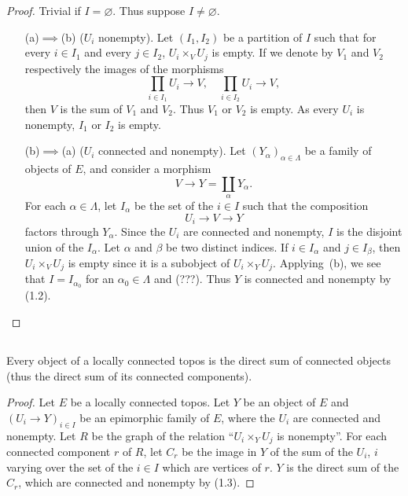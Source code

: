 \documentclass[10pt]{amsart}
\begin{document}
\begin{proof}
Trivial if $I=\varnothing$.
Thus suppose $I\neq\varnothing$.
\begin{enumerate}
  \item[(a)$\implies$(b)] ($U_i$ nonempty). Let $(I_1,I_2)$ be a partition of $I$ such that for every $i\in I_1$ and every $j\in I_2$, $U_i\times_V U_j$ is empty.
    If we denote by $V_1$ and $V_2$ respectively the images of the morphisms
    \[
      \prod_{i\in I_1}U_i\longrightarrow V,\quad\prod_{i\in I_2}U_i\longrightarrow V,
    \]
    then $V$ is the sum of $V_1$ and $V_2$.
    Thus $V_1$ or $V_2$ is empty.
    As every $U_i$ is nonempty, $I_1$ or $I_2$ is empty.
  \item[(b)$\implies$(a)] ($U_i$ connected and nonempty). Let $(Y_\alpha)_{\alpha\in\Lambda}$ be a family of objects of $E$, and consider a morphism
    \[
      V\longrightarrow Y=\coprod_\alpha Y_\alpha.
    \]
    For each $\alpha\in\Lambda$, let $I_\alpha$ be the set of the $i\in I$ such that the composition
    \[
      U_i\longrightarrow V\longrightarrow Y
    \]
    factors through $Y_\alpha$.
    Since the $U_i$ are connected and nonempty, $I$ is the disjoint union of the $I_\alpha$.
    Let $\alpha$ and $\beta$ be two distinct indices.
    If $i\in I_\alpha$ and $j\in I_\beta$, then $U_i\times_V U_j$ is empty since it is a subobject of $U_i\times_Y U_j$.
    Applying~(b), we see that $I=I_{\alpha_0}$ for an $\alpha_0\in\Lambda$ and (???).
    Thus $Y$ is connected and nonempty by (1.2).
\end{enumerate}
\end{proof}

\subsection{}
Every object of a locally connected topos is the direct sum of connected objects (thus the direct sum of its connected components).

\begin{proof}
Let $E$ be a locally connected topos.
Let $Y$ be an object of $E$ and $(U_i\to Y)_{i\in I}$ be an epimorphic family of $E$, where the $U_i$ are connected and nonempty.
Let $R$ be the graph of the relation ``$U_i\times_Y U_j$ is nonempty''.
For each connected component $r$ of $R$, let $C_r$ be the image in $Y$ of the sum of the $U_i$, $i$ varying over the set of the $i\in I$ which are vertices of $r$.
$Y$ is the direct sum of the $C_r$, which are connected and nonempty by (1.3).
\end{proof}
\end{document}
